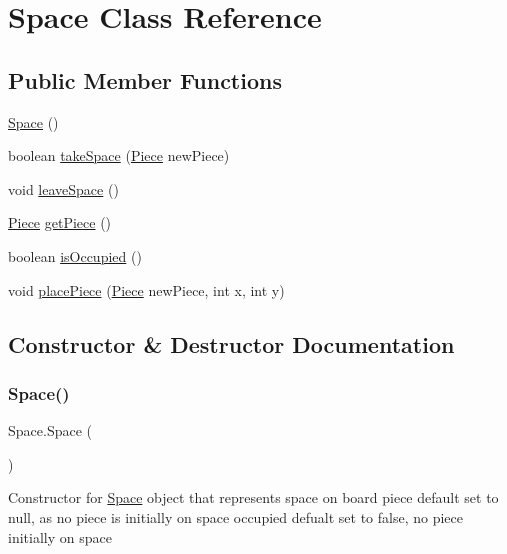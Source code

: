 \hypertarget{class_space}{}\section{Space Class Reference}
\label{class_space}
\subsection*{Public Member Functions}
\begin{DoxyCompactItemize}
\item 
\mbox{\hyperlink{class_space_afe9f3c2c73789f807e598d06c60515ca}{Space}} ()
\item 
boolean \mbox{\hyperlink{class_space_a7450bdf13ff2dc4dbbe89573d467f579}{take\+Space}} (\mbox{\hyperlink{class_piece}{Piece}} new\+Piece)
\item 
void \mbox{\hyperlink{class_space_abdbc9be1450dc19348b7889e8265ee5c}{leave\+Space}} ()
\item 
\mbox{\hyperlink{class_piece}{Piece}} \mbox{\hyperlink{class_space_a6ca21c64ae7fe878d4f574e47d9d28c2}{get\+Piece}} ()
\item 
boolean \mbox{\hyperlink{class_space_acd19ec863f80b21419430fb34e51bf08}{is\+Occupied}} ()
\item 
void \mbox{\hyperlink{class_space_a3216bbe73ee02cf97a2b4c90ccf88e7f}{place\+Piece}} (\mbox{\hyperlink{class_piece}{Piece}} new\+Piece, int x, int y)
\end{DoxyCompactItemize}


\subsection{Constructor \& Destructor Documentation}
\mbox{\label{class_space_afe9f3c2c73789f807e598d06c60515ca}} 
\subsubsection{\texorpdfstring{Space()}{Space()}}
{\footnotesize\ttfamily Space.\+Space (\begin{DoxyParamCaption}{ }\end{DoxyParamCaption})\hspace{0.3cm}{\ttfamily [inline]}}

Constructor for \mbox{\hyperlink{class_space}{Space}} object that represents space on board piece default set to null, as no piece is initially on space occupied defualt set to false, no piece initially on space 

